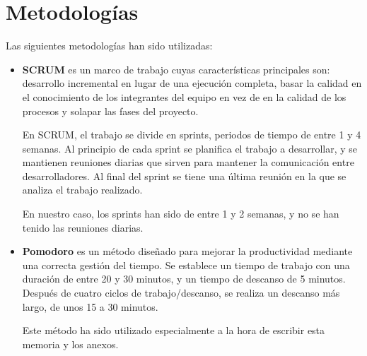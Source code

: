

\section{Metodologías}

Las siguientes metodologías han sido utilizadas:
\begin{itemize}
    \item \textbf{SCRUM} es un marco de trabajo cuyas características principales son: desarrollo incremental
        en lugar de una ejecución completa, basar la calidad en el conocimiento de los integrantes del
        equipo en vez de en la calidad de los procesos y solapar las fases del proyecto.

        En SCRUM, el trabajo se divide en sprints, periodos de tiempo de entre 1 y 4 semanas. Al principio
        de cada sprint se planifica el trabajo a desarrollar, y se mantienen reuniones diarias que sirven para 
        mantener la comunicación entre desarrolladores. Al final del sprint se tiene una última reunión en la que
        se analiza el trabajo realizado.

        En nuestro caso, los sprints han sido de entre 1 y 2 semanas, y no se han tenido las reuniones diarias.
    \item \textbf{Pomodoro} es un método diseñado para mejorar la productividad mediante una correcta gestión del tiempo.
        Se establece un tiempo de trabajo con una duración de entre 20 y 30 minutos, y un tiempo de descanso de
        5 minutos. Después de cuatro ciclos de trabajo/descanso, se realiza un descanso más largo, de unos 15 a 30
        minutos.

        Este método ha sido utilizado especialmente a la hora de escribir esta memoria y los anexos.
\end{itemize}

